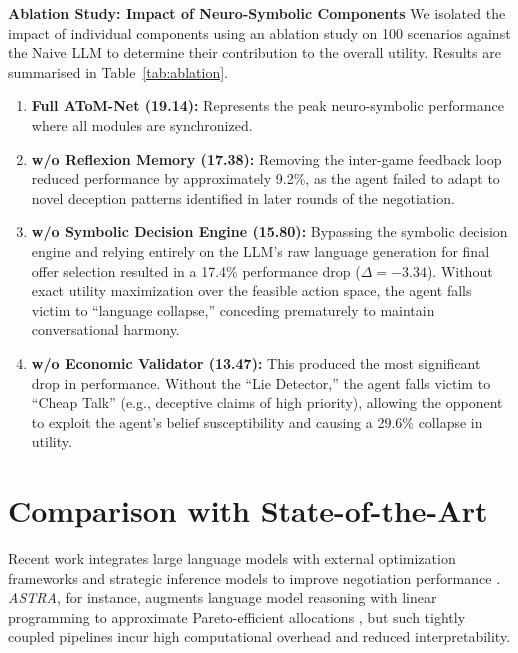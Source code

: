 \documentclass[11pt]{article}
\begin{document}
\textbf{Ablation Study: Impact of Neuro-Symbolic Components} 
We isolated the impact of individual components using an ablation study on 100 scenarios against
the Naive LLM to determine their contribution to the overall utility. Results are summarised in
Table~\ref{tab:ablation}.

\begin{enumerate}
    \item \textbf{Full AToM-Net (19.14):} Represents the peak neuro-symbolic performance where
          all modules are synchronized.
    \item \textbf{w/o Reflexion Memory (17.38):} Removing the inter-game feedback loop reduced
          performance by approximately 9.2\%, as the agent failed to adapt to novel deception
          patterns identified in later rounds of the negotiation.
    \item \textbf{w/o Symbolic Decision Engine (15.80):} Bypassing the symbolic decision engine and
          relying entirely on the LLM's raw language generation for final offer selection resulted
          in a 17.4\% performance drop ($\Delta = -3.34$). Without exact utility maximization over
          the feasible action space, the agent falls victim to ``language collapse,'' conceding
          prematurely to maintain conversational harmony.
    \item \textbf{w/o Economic Validator (13.47):} This produced the most significant drop in
          performance. Without the ``Lie Detector,'' the agent falls victim to ``Cheap Talk''
          (e.g., deceptive claims of high priority), allowing the opponent to exploit the agent's
          belief susceptibility and causing a 29.6\% collapse in utility.
\end{enumerate}

\section{Comparison with State-of-the-Art}

Recent work integrates large language models with external optimization frameworks and strategic inference models to improve negotiation performance \cite{llmdecision,sidconarena2026,strategicbargaining2026}. \textit{ASTRA}, for instance, augments language model reasoning with linear programming to approximate Pareto-efficient allocations \cite{astra}, but such tightly coupled pipelines incur high computational overhead and reduced interpretability.
\end{document}
